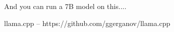 \documentclass{beamer}
\begin{document}
\begin{frame}[plain]
\end{frame}

\begin{frame}
	And you can run a 7B model on this....
\end{frame}

\begin{frame}[plain]
\end{frame}



\begin{frame}
	llama.cpp -- https://github.com/ggerganov/llama.cpp
\end{frame}
\end{document}
